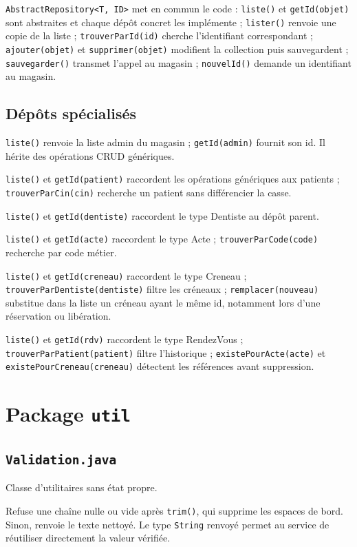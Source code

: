 \documentclass[11pt,a4paper]{report}
\begin{document}
\texttt{AbstractRepository<T, ID>} met en commun le code : \texttt{liste()} et \texttt{getId(objet)} sont abstraites et chaque dépôt concret les implémente ; \texttt{lister()} renvoie une copie de la liste ; \texttt{trouverParId(id)} cherche l'identifiant correspondant ; \texttt{ajouter(objet)} et \texttt{supprimer(objet)} modifient la collection puis sauvegardent ; \texttt{sauvegarder()} transmet l'appel au magasin ; \texttt{nouvelId()} demande un identifiant au magasin.

\section{Dépôts spécialisés}
\begin{description}[leftmargin=5cm,style=nextline]
\item[\texttt{AdministrateurRepository.java}] \texttt{liste()} renvoie la liste admin du magasin ; \texttt{getId(admin)} fournit son id. Il hérite des opérations CRUD génériques.
\item[\texttt{PatientRepository.java}] \texttt{liste()} et \texttt{getId(patient)} raccordent les opérations génériques aux patients ; \texttt{trouverParCin(cin)} recherche un patient sans différencier la casse.
\item[\texttt{DentisteRepository.java}] \texttt{liste()} et \texttt{getId(dentiste)} raccordent le type Dentiste au dépôt parent.
\item[\texttt{ActeRepository.java}] \texttt{liste()} et \texttt{getId(acte)} raccordent le type Acte ; \texttt{trouverParCode(code)} recherche par code métier.
\item[\texttt{CreneauRepository.java}] \texttt{liste()} et \texttt{getId(creneau)} raccordent le type Creneau ; \texttt{trouverParDentiste(dentiste)} filtre les créneaux ; \texttt{remplacer(nouveau)} substitue dans la liste un créneau ayant le même id, notamment lors d'une réservation ou libération.
\item[\texttt{RendezVousRepository.java}] \texttt{liste()} et \texttt{getId(rdv)} raccordent le type RendezVous ; \texttt{trouverParPatient(patient)} filtre l'historique ; \texttt{existePourActe(acte)} et \texttt{existePourCreneau(creneau)} détectent les références avant suppression.
\end{description}

\chapter{Package \texttt{util}}
\section{\texttt{Validation.java}}
Classe d'utilitaires sans état propre.
\begin{description}[leftmargin=4cm,style=nextline]
\item[\texttt{verifierRempli(valeur, champ)}] Refuse une chaîne nulle ou vide après \texttt{trim()}, qui supprime les espaces de bord. Sinon, renvoie le texte nettoyé. Le type \texttt{String} renvoyé permet au service de réutiliser directement la valeur vérifiée.
\end{description}
\end{document}
